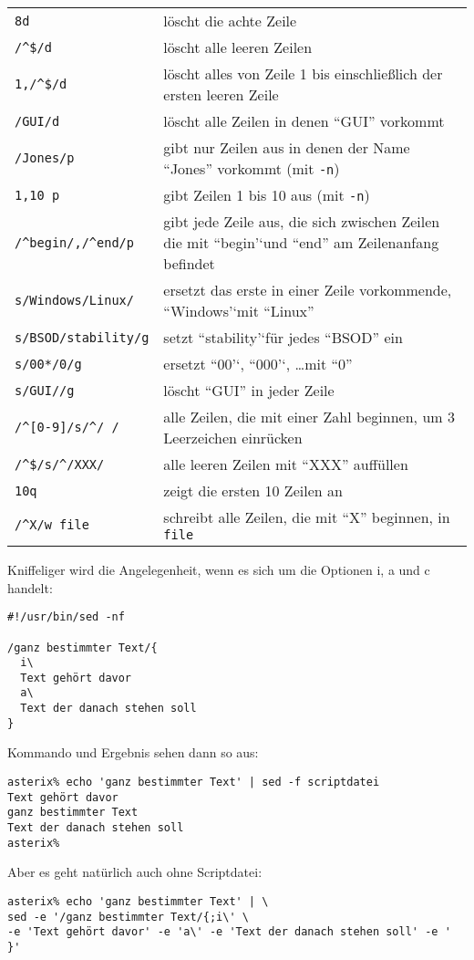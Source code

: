 \documentclass[12pt,]{article}
\begin{document}
\begin{longtable}[c]{@{}ll@{}}
\toprule
\texttt{8d} & löscht die achte Zeile\tabularnewline
\texttt{/\^{}\$/d} & löscht alle leeren Zeilen\tabularnewline
\texttt{1,/\^{}\$/d} & löscht alles von Zeile 1 bis einschließlich der
ersten leeren Zeile\tabularnewline
\texttt{/GUI/d} & löscht alle Zeilen in denen ``GUI''
vorkommt\tabularnewline
\texttt{/Jones/p} & gibt nur Zeilen aus in denen der Name ``Jones''
vorkommt (mit \texttt{-n})\tabularnewline
\texttt{1,10\ p} & gibt Zeilen 1 bis 10 aus (mit
\texttt{-n})\tabularnewline
\texttt{/\^{}begin/,/\^{}end/p} & gibt jede Zeile aus, die sich zwischen
Zeilen die mit ``begin'`und ``end'' am Zeilenanfang
befindet\tabularnewline
\texttt{s/Windows/Linux/} & ersetzt das erste in einer Zeile
vorkommende, ``Windows'`mit ``Linux''\tabularnewline
\texttt{s/BSOD/stability/g} & setzt ``stability'`für jedes ``BSOD''
ein\tabularnewline
\texttt{s/00*/0/g} & ersetzt ``00'`, ``000'`, \ldots{}mit
``0''\tabularnewline
\texttt{s/GUI//g} & löscht ``GUI'' in jeder Zeile\tabularnewline
\texttt{/\^{}{[}0-9{]}/s/\^{}/\ /} & alle Zeilen, die mit einer Zahl
beginnen, um 3 Leerzeichen einrücken\tabularnewline
\texttt{/\^{}\$/s/\^{}/XXX/} & alle leeren Zeilen mit ``XXX''
auffüllen\tabularnewline
\texttt{10q} & zeigt die ersten 10 Zeilen an\tabularnewline
\texttt{/\^{}X/w\ file} & schreibt alle Zeilen, die mit ``X'' beginnen,
in \texttt{file}\tabularnewline
\bottomrule
\end{longtable}

Kniffeliger wird die Angelegenheit, wenn es sich um die Optionen i, a
und c handelt:

\begin{verbatim}
#!/usr/bin/sed -nf

/ganz bestimmter Text/{
  i\
  Text gehört davor
  a\
  Text der danach stehen soll
}
\end{verbatim}

Kommando und Ergebnis sehen dann so aus:

\begin{verbatim}
asterix% echo 'ganz bestimmter Text' | sed -f scriptdatei
Text gehört davor
ganz bestimmter Text
Text der danach stehen soll
asterix%
\end{verbatim}

Aber es geht natürlich auch ohne Scriptdatei:

\begin{verbatim}
asterix% echo 'ganz bestimmter Text' | \
sed -e '/ganz bestimmter Text/{;i\' \
-e 'Text gehört davor' -e 'a\' -e 'Text der danach stehen soll' -e ' }'
\end{verbatim}
\end{document}
